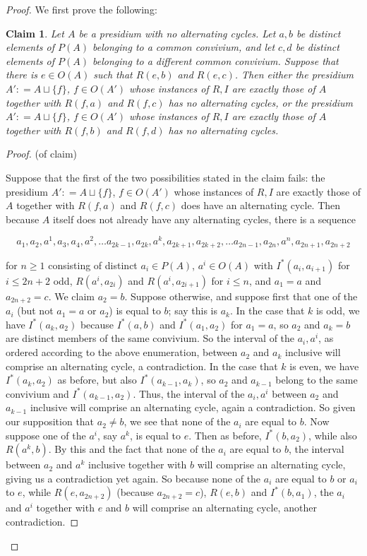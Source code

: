 \documentclass{amsart}
\newtheorem{claim}[theorem]{Claim}
\theoremstyle{definition}
\theoremstyle{remark}
\numberwithin{equation}{section}
\begin{document}
\begin{proof}
    We first prove the following:


        \begin{claim}
       \label{order construction 1} Let $A$ be a presidium with no alternating cycles. Let $a, b$ be distinct elements of $P(A)$ belonging to a common convivium, and let $c, d$ be distinct elements of $P(A)$ belonging to a different common convivium. Suppose that there is $e \in O(A) $ such that $R(e, b)$ and $R(e, c)$. Then either the presidium $A' : = A \sqcup \{f\}$, $f \in O(A')$ whose instances of $R, I$ are exactly those of $A$ together with $R(f, a)$ and $R(f, c)$ has no alternating cycles, or the presidium $A' : = A \sqcup \{f\}$, $f \in O(A')$ whose instances of $R, I$ are exactly those of $A$ together with $R(f, b)$ and $R(f, d)$ has no alternating cycles.
    \end{claim}
\begin{proof}
    (of claim)
    
    Suppose that the first of the two possibilities stated in the claim fails: the presidium $A' : = A \sqcup \{f\}$, $f \in O(A')$ whose instances of $R, I$ are exactly those of $A$ together with $R(f, a)$ and $R(f, c)$ does have an alternating cycle. Then because $A$ itself does not already have any alternating cycles, there is a sequence 
   
   $$a_1, a_2, a^{1}, a_{3}, a_{4}, a^{2}, \ldots a_{2k-1}, a_{2k}, a^{k}, a_{2k+1}, a_{2k+2}, \ldots a_{2n-1}, a_{2n}, a^{n}, a_{2n+1}, a_{2n+2} $$

for $n \geq 1$ consisting of distinct $a_i \in P(A)$, $a^i \in O(A)$ with $I^{*}(a_i, a_{i+1})$ for $i \leq 2n+2$ odd, $R(a^i, a_{2i})$ and $R(a^i, a_{2i+1})$ for $i \leq n$,  and $a_1 = a$ and $a_{2n+2} = c$.  We claim $a_2 = b$. Suppose otherwise, and suppose first that one of the $a_i$ (but not $a_1= a$ or $a_2$) is equal to $b$; say this is $a_k$.  In the case that $k$ is odd, we have $I^{*}(a_k, a_2)$ because $I^{*}(a, b) $ and $I^{*}(a_{1}, a_{2})$ for $a_{1} = a$, so $a_{2}$ and $a_{k} = b$ are distinct members of the same convivium. So the interval of the $a_i, a^{i}$, as ordered according to the above enumeration, between $a_{2}$ and $a_{k}$ inclusive will comprise an alternating cycle, a contradiction.  In the case that $k$ is even, we have $I^{*}(a_k, a_2)$ as before, but also $I^{*}(a_{k-1}, a_k)$, so $a_{2}$ and $a_{k-1}$ belong to the same convivium and $I^{*}(a_{k-1}, a_{2})$. Thus, the interval of the $a_i, a^{i}$ between $a_{2}$ and $a_{k-1}$ inclusive will comprise an alternating cycle, again a contradiction.  So given our supposition that $a_2 \neq b$, we see that none of the $a_i$ are equal to $b$. Now suppose one of the $a^i$, say $a^{k}$, is equal to $e$.  Then as before, $I^{*}(b, a_{2})$, while also $R(a^{k}, b)$. By this and the fact that none of the $a_i$ are equal to $b$, the interval between $a_{2}$ and $a^{k}$ inclusive together with $b$ will comprise an alternating cycle, giving us a contradiction yet again. So because none of the $a_i$ are equal to $b$ or $a_i$ to $e$, while $R(e, a_{2n+2})$ (because $a_{2n+2}=c$), $R(e, b)$ and $I^{*}(b, a_1)$, the $a_i$ and $a^i$ together with $e$ and $b$ will comprise an alternating cycle, another contradiction.


\end{proof}
\end{proof}
\end{document}

